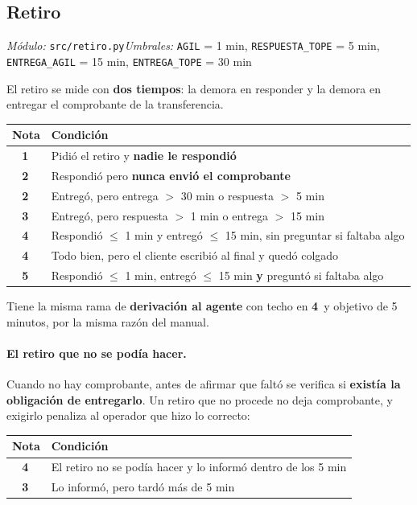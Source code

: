 \documentclass[11pt,a4paper]{article}
\newcommand{\cod}[1]{\texttt{\small #1}}
\newcommand{\est}[1]{\textbf{#1}\,\raisebox{0.5pt}{$\star$}}
\begin{document}
\subsection{Retiro}
\emph{Módulo:} \cod{src/retiro.py}\quad\emph{Umbrales:} \cod{AGIL} = 1 min,
\cod{RESPUESTA\_TOPE} = 5 min, \cod{ENTREGA\_AGIL} = 15 min, \cod{ENTREGA\_TOPE} = 30 min

El retiro se mide con \textbf{dos tiempos}: la demora en responder y la demora en
entregar el comprobante de la transferencia.

\begin{center}
\begin{tabularx}{\textwidth}{@{}cX@{}}
\toprule
\textbf{Nota} & \textbf{Condición} \\
\midrule
\est{1} & Pidió el retiro y \textbf{nadie le respondió} \\
\est{2} & Respondió pero \textbf{nunca envió el comprobante} \\
\est{2} & Entregó, pero entrega $>$ 30 min o respuesta $>$ 5 min \\
\est{3} & Entregó, pero respuesta $>$ 1 min o entrega $>$ 15 min \\
\est{4} & Respondió $\le$ 1 min y entregó $\le$ 15 min, sin preguntar si faltaba algo \\
\est{4} & Todo bien, pero el cliente escribió al final y quedó colgado \\
\est{5} & Respondió $\le$ 1 min, entregó $\le$ 15 min \textbf{y} preguntó si faltaba algo \\
\bottomrule
\end{tabularx}
\end{center}

Tiene la misma rama de \textbf{derivación al agente} con techo en \est{4} y objetivo
de 5 minutos, por la misma razón del manual.

\paragraph{El retiro que no se podía hacer.} Cuando no hay comprobante, antes de afirmar
que faltó se verifica si \textbf{existía la obligación de entregarlo}. Un retiro que no
procede no deja comprobante, y exigirlo penaliza al operador que hizo lo correcto:

\begin{center}
\begin{tabularx}{\textwidth}{@{}cX@{}}
\toprule
\textbf{Nota} & \textbf{Condición} \\
\midrule
\est{4} & El retiro no se podía hacer y lo informó dentro de los 5 min \\
\est{3} & Lo informó, pero tardó más de 5 min \\
\bottomrule
\end{tabularx}
\end{center}
\end{document}
